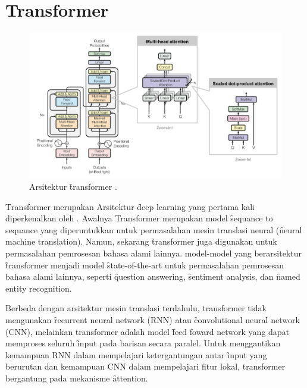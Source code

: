 \section{Transformer}
	\begin{figure}
		\centering
		\includegraphics[width=1\textwidth]{assets/pics/lilianweng-transformer.png}
		\caption{Arsitektur \f{transformer} \citep{weng2018attention}.}
		\label{fig:transformer}
	\end{figure}
	\f{Transformer} merupakan Arsitektur \f{deep learning} yang pertama kali diperkenalkan oleh \cite{transformerori}. Awalnya Transformer  merupakan model \f{sequance to sequance} yang diperuntukkan untuk permasalahan mesin translasi neural (\f{neural machine translation}). Namun, sekarang \f{transformer} juga digunakan untuk permasalahan pemrosesan bahasa alami lainnya. model-model yang berarsitektur \f{transformer} menjadi model \f{state-of-the-art} untuk permasalahan pemrosesan bahasa alami lainnya, seperti \f{question answering}, \f{sentiment analysis}, dan \f{named entity recognition}.
 
	Berbeda dengan arsitektur mesin translasi terdahulu, transformer tidak mengunakan \f{recurrent neural network} (RNN) atau \f{convolutional neural network} (CNN), melainkan transformer adalah model \f{feed foward network} yang dapat memproses seluruh \f{input} pada barisan secara paralel. Untuk menggantikan kemampuan RNN dalam mempelajari ketergantungan antar \f{input} yang berurutan dan kemampuan CNN dalam mempelajari fitur lokal, transformer bergantung pada mekanisme \f{attention}.

